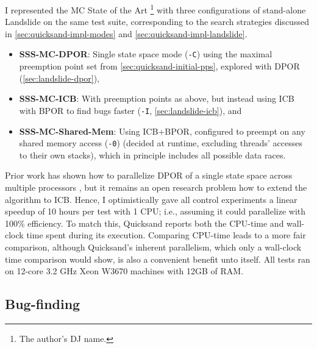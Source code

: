 I represented the MC State of the Art%
\footnote{The author's DJ name.}
with three configurations of stand-alone Landslide on the same test suite,
corresponding to the search strategies discussed in \cref{sec:quicksand-impl-modes} and \cref{sec:quicksand-impl-landslide}.

\begin{itemize}
	\item {\bf SSS-MC-DPOR}: Single state space mode ({\tt -C})
		using the maximal preemption point set from \cref{sec:quicksand-initial-pps},
		explored with DPOR (\cref{sec:landslide-dpor}),
        \item {\bf SSS-MC-ICB}: With preemption points as above,
		but instead using ICB \cite{chess-icb} with BPOR \cite{bpor} to find bugs faster
		({\tt -I}, \cref{sec:landslide-icb}), and
        \item {\bf SSS-MC-Shared-Mem}:
		Using ICB+BPOR, configured to preempt on any shared memory access ({\tt -0})
                (decided at runtime, excluding threads' accesses to their own stacks),
                which in principle includes all possible data races.
\end{itemize}

Prior work has shown how to parallelize DPOR of a single state space across multiple processors \cite{parallel-dpor},
but it remains an open research problem how to extend the algorithm to ICB.
Hence, I optimistically gave all control experiments a linear speedup of 10 hours per test with 1 CPU;
i.e., assuming it could parallelize with 100\% efficiency.
To match this,
Quicksand reports both the CPU-time and wall-clock time spent during its execution.
Comparing CPU-time leads to a more fair comparison,
although Quicksand's inherent parallelism, which only a wall-clock time comparison would show,
is also a convenient benefit unto itself.
All tests ran on 12-core 3.2 GHz Xeon W3670 machines with 12GB of RAM.


\subsection{Bug-finding}
\label{sec:quicksand-eval-bugs}

